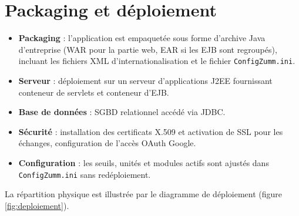\section{Packaging et déploiement}
\begin{itemize}
  \item \textbf{Packaging} : l'application est empaquetée sous forme d'archive Java d'entreprise (WAR pour la partie web, EAR si les EJB sont regroupés), incluant les fichiers XML d'internationalisation et le fichier \texttt{ConfigZumm.ini}.
  \item \textbf{Serveur} : déploiement sur un serveur d'applications J2EE fournissant conteneur de servlets et conteneur d'EJB.
  \item \textbf{Base de données} : SGBD relationnel accédé via JDBC.
  \item \textbf{Sécurité} : installation des certificats X.509 et activation de SSL pour les échanges, configuration de l'accès OAuth Google.
  \item \textbf{Configuration} : les seuils, unités et modules actifs sont ajustés dans \texttt{ConfigZumm.ini} sans redéploiement.
\end{itemize}
La répartition physique est illustrée par le diagramme de déploiement (figure \ref{fig:deploiement}).

